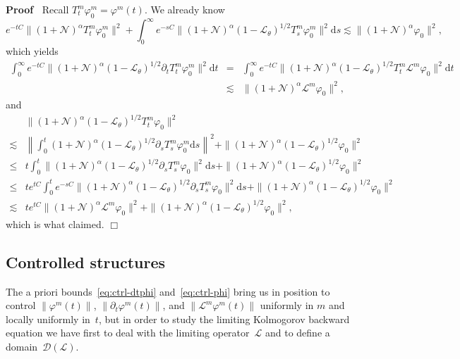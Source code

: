 \documentclass[10pt]{article}
\newcommand{\mathd}{\mathrm{d}}
\newenvironment{proof}{\noindent\textbf{Proof\ }}{\hspace*{\fill}$\Box$\medskip}
\begin{document}
\begin{proof}
  Recall $T^m_t \varphi^m_0 = \varphi^m (t)$. We already know
  \[ e^{- t C} \| (1 +\mathcal{N})^{\alpha} T^m_t \varphi^m_0 \|^2 +
     \int_0^{\infty} e^{- s C} \| (1 +\mathcal{N})^{\alpha} (1
     -\mathcal{L}_{\theta})^{1 / 2} T^m_s \varphi^m_0 \|^2 \mathd s \lesssim
     \| (1 +\mathcal{N})^{\alpha} \varphi_0 \|^2, \]
  which yields
  \begin{eqnarray*}
    \int_0^{\infty} e^{- t C} \| (1 +\mathcal{N})^{\alpha} (1
    -\mathcal{L}_{\theta})^{1 / 2} \partial_t T^m_t \varphi^m_0 \|^2 \mathd t
    & = & \int_0^{\infty} e^{- t C} \| (1 +\mathcal{N})^{\alpha} (1
    -\mathcal{L}_{\theta})^{1 / 2} T^m_t \mathcal{L}^m \varphi_0 \|^2 \mathd
    t\\
    & \lesssim & \| (1 +\mathcal{N})^{\alpha} \mathcal{L}^m \varphi_0 \|^2,
  \end{eqnarray*}
  and
  \[ \begin{array}{ll}
       & \| (1 +\mathcal{N})^{\alpha} (1 -\mathcal{L}_{\theta})^{1 / 2} T^m_t
       \varphi_0 \|^2\\
       \lesssim & \left\| \int_0^t (1 +\mathcal{N})^{\alpha} (1
       -\mathcal{L}_{\theta})^{1 / 2} \partial_s T^m_s \varphi^m_0 \mathd s
       \right\|^2 + \| (1 +\mathcal{N})^{\alpha} (1 -\mathcal{L}_{\theta})^{1
       / 2} \varphi_0 \|^2\\
       \leqslant & t \int_0^t \| (1 +\mathcal{N})^{\alpha} (1
       -\mathcal{L}_{\theta})^{1 / 2} \partial_s T^m_s \varphi_0 \|^2 \mathd s
       + \| (1 +\mathcal{N})^{\alpha} (1 -\mathcal{L}_{\theta})^{1 / 2}
       \varphi_0 \|^2\\
       \leqslant & t e^{t C} \int_0^t e^{- s C} \| (1 +\mathcal{N})^{\alpha}
       (1 -\mathcal{L}_{\theta})^{1 / 2} \partial_s T^m_s \varphi_0 \|^2
       \mathd s + \| (1 +\mathcal{N})^{\alpha} (1 -\mathcal{L}_{\theta})^{1 /
       2} \varphi_0 \|^2\\
       \lesssim & t e^{t C} \| (1 +\mathcal{N})^{\alpha} \mathcal{L}^m
       \varphi_0 \|^2 + \| (1 +\mathcal{N})^{\alpha} (1
       -\mathcal{L}_{\theta})^{1 / 2} \varphi_0 \|^2,
     \end{array} \]
  which is what claimed.
\end{proof}

\subsection{Controlled structures}

The a priori bounds~{\eqref{eq:ctrl-dtphi}} and~{\eqref{eq:ctrl-phi}} bring us
in position to control $\| \varphi^m (t) \|$, $\| \partial_t \varphi^m (t)
\|$, and $\| \mathcal{L}^m \varphi^m (t) \|$ uniformly in $m$ and locally
uniformly in~$t$, but in order to study the limiting Kolmogorov backward
equation we have first to deal with the limiting operator~$\mathcal{L}$ and to
define a domain~$\mathcal{D} (\mathcal{L})$.
\end{document}
